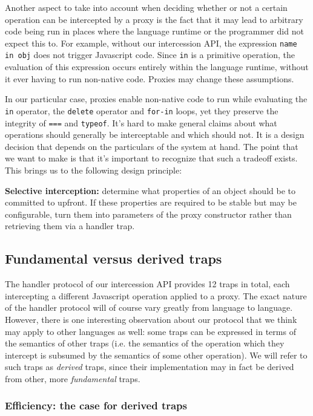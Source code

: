 \documentclass{acm_proc_article-sp}
\begin{document}
Another aspect to take into account when deciding whether or not a certain operation can be intercepted by a proxy is the fact that it may lead to arbitrary code being run in places where the language runtime or the programmer did not expect this to. For example, without our intercession API, the expression \texttt{name in obj} does not trigger Javascript code. Since \texttt{in} is a primitive operation, the evaluation of this expression occurs entirely within the language runtime, without it ever having to run non-native code. Proxies may change these assumptions.

In our particular case, proxies enable non-native code to run while evaluating the \texttt{in} operator, the \texttt{delete} operator and \texttt{for-in} loops, yet they preserve the integrity of \texttt{===} and \texttt{typeof}. It's hard to make general claims about what operations should generally be interceptable and which should not. It is a design decision that depends on the particulars of the system at hand. The point that we want to make is that it's important to recognize that such a tradeoff exists. This brings us to the following design principle:

\textbf{Selective interception:} determine what properties of an object should be to committed to upfront. If these properties are required to be stable but may be configurable, turn them into parameters of the proxy constructor rather than retrieving them via a handler trap.

\subsection{Fundamental versus derived traps}

The handler protocol of our intercession API provides 12 traps in total, each intercepting a different Javascript operation applied to a proxy. The exact nature of the handler protocol will of course vary greatly from language to language. However, there is one interesting observation about our protocol that we think may apply to other languages as well: some traps can be expressed in terms of the semantics of other traps (i.e. the semantics of the operation which they intercept is subsumed by the semantics of some other operation). We will refer to such traps as \emph{derived} traps, since their implementation may in fact be derived from other, more \emph{fundamental} traps.

\subsubsection{Efficiency: the case for derived traps}
\end{document}
